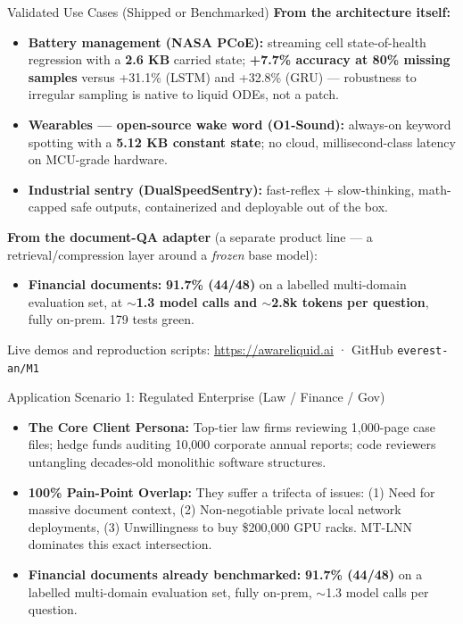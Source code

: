 \documentclass[aspectratio=169, 10pt]{beamer}
\begin{document}
\begin{frame}{Validated Use Cases (Shipped or Benchmarked)}
\small
\textbf{From the architecture itself:}
\begin{itemize}\itemsep=0.4em
    \item \textbf{Battery management (NASA PCoE):} streaming cell state-of-health regression with a \textbf{2.6 KB} carried state; \textbf{+7.7\% accuracy at 80\% missing samples} versus +31.1\% (LSTM) and +32.8\% (GRU) --- robustness to irregular sampling is native to liquid ODEs, not a patch.
    \item \textbf{Wearables --- open-source wake word (O1-Sound):} always-on keyword spotting with a \textbf{5.12 KB constant state}; no cloud, millisecond-class latency on MCU-grade hardware.
    \item \textbf{Industrial sentry (DualSpeedSentry):} fast-reflex + slow-thinking, math-capped safe outputs, containerized and deployable out of the box.
\end{itemize}
\vspace{0.2em}
\textbf{From the document-QA adapter} (a separate product line --- a retrieval/compression layer around a \emph{frozen} base model):
\begin{itemize}\itemsep=0.4em
    \item \textbf{Financial documents:} \textbf{91.7\% (44/48)} on a labelled multi-domain evaluation set, at \textbf{$\sim$1.3 model calls and $\sim$2.8k tokens per question}, fully on-prem. 179 tests green.
\end{itemize}
\vspace{0.2em}
{\footnotesize Live demos and reproduction scripts: \url{https://awareliquid.ai} · GitHub \texttt{everest-an/M1}}
\end{frame}

\begin{frame}{Application Scenario 1: Regulated Enterprise (Law / Finance / Gov)}
\begin{itemize}
    \item \textbf{The Core Client Persona:} Top-tier law firms reviewing 1,000-page case files; hedge funds auditing 10,000 corporate annual reports; code reviewers untangling decades-old monolithic software structures.
    \item \textbf{100\% Pain-Point Overlap:} They suffer a trifecta of issues: (1) Need for massive document context, (2) Non-negotiable private local network deployments, (3) Unwillingness to buy \$200,000 GPU racks. MT-LNN dominates this exact intersection.
    \item \textbf{Financial documents already benchmarked:} \textbf{91.7\% (44/48)} on a labelled multi-domain evaluation set, fully on-prem, $\sim$1.3 model calls per question.
\end{itemize}
\end{frame}
\end{document}
